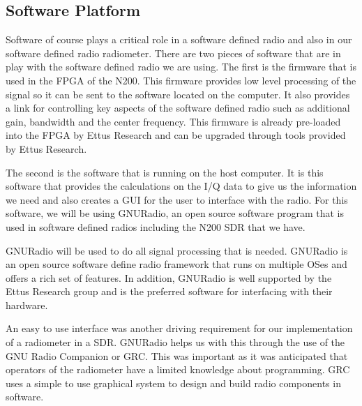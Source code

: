 \subsection{Software Platform} \label{software_platform}

Software of course plays a critical role in a software defined radio and also in our software defined radio radiometer.  There are two pieces of software that are in play with the software defined radio we are using.  The first is the firmware that is used in the FPGA of the N200.  This firmware provides low level processing of the signal so it can be sent to the software located on the computer.  It also provides a link for controlling key aspects of the software defined radio such as additional gain, bandwidth and the center frequency.  This firmware is already pre-loaded into the FPGA by Ettus Research and can be upgraded through tools provided by Ettus Research.

The second is the software that is running on the host computer.  It is this software that provides the calculations on the I/Q data to give us the information we need and also creates a GUI for the user to interface with the radio.  For this software, we will be using GNURadio, an open source software program that is used in software defined radios including the N200 SDR that we have.  

GNURadio will be used to do all signal processing that is needed.  GNURadio is an open source software define radio framework that runs on multiple OSes and offers a rich set of features.  In addition, GNURadio is well supported by the Ettus Research group and is the preferred software for interfacing with their hardware.  

An easy to use interface was another driving requirement for our implementation of a radiometer in a SDR.  GNURadio helps us with this through the use of the GNU Radio Companion or GRC.  This was important as it was anticipated that operators of the radiometer have a limited knowledge about programming.  GRC uses a simple to use graphical system to design and build radio components in software.




